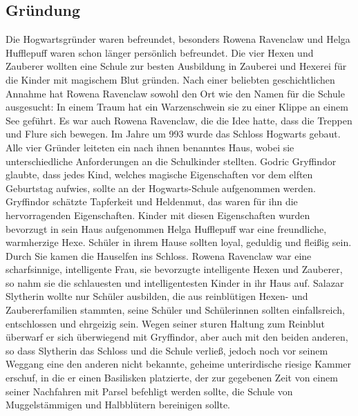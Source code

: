 \documentclass[a4paper, 10pt]{article}
\begin{document}
\subsection*{\Large Gründung}
Die Hogwartsgründer waren befreundet, besonders Rowena Ravenclaw und Helga Hufflepuff waren schon länger persönlich befreundet. Die vier Hexen und Zauberer wollten eine Schule zur besten Ausbildung in Zauberei und Hexerei für die Kinder mit magischem Blut gründen. Nach einer beliebten geschichtlichen Annahme hat Rowena Ravenclaw sowohl den Ort wie den Namen für die Schule ausgesucht: In einem Traum hat ein Warzenschwein sie zu einer Klippe an einem See geführt. Es war auch Rowena Ravenclaw, die die Idee hatte, dass die Treppen und Flure sich bewegen.
\vspace{10pt}
\newline
Im Jahre um 993 wurde das Schloss Hogwarts gebaut. Alle vier Gründer leiteten ein nach ihnen benanntes Haus, wobei sie unterschiedliche Anforderungen an die Schulkinder stellten. Godric Gryffindor glaubte, dass jedes Kind, welches magische Eigenschaften vor dem elften Geburtstag aufwies, sollte an der Hogwarts-Schule aufgenommen werden. Gryffindor schätzte Tapferkeit und Heldenmut, das waren für ihn die hervorragenden Eigenschaften. Kinder mit diesen Eigenschaften wurden bevorzugt in sein Haus aufgenommen
\vspace{10pt}
\newline
Helga Hufflepuff war eine freundliche, warmherzige Hexe. Schüler in ihrem Hause sollten loyal, geduldig und fleißig sein. Durch Sie kamen die Hauselfen ins Schloss.
\vspace{10pt}
\newline
Rowena Ravenclaw war eine scharfsinnige, intelligente Frau, sie bevorzugte intelligente Hexen und Zauberer, so nahm sie die schlauesten und intelligentesten Kinder in ihr Haus auf.
\vspace{10pt}
\newline
Salazar Slytherin wollte nur Schüler ausbilden, die aus reinblütigen Hexen- und Zaubererfamilien stammten, seine Schüler und Schülerinnen sollten einfallsreich, entschlossen und ehrgeizig sein. Wegen seiner sturen Haltung zum Reinblut überwarf er sich überwiegend mit Gryffindor, aber auch mit den beiden anderen, so dass Slytherin das Schloss und die Schule verließ, jedoch noch vor seinem Weggang eine den anderen nicht bekannte, geheime unterirdische riesige Kammer erschuf, in die er einen Basilisken platzierte, der zur gegebenen Zeit von einem seiner Nachfahren mit Parsel befehligt werden sollte, die Schule von Muggelstämmigen und Halbblütern bereinigen sollte.
\end{document}
